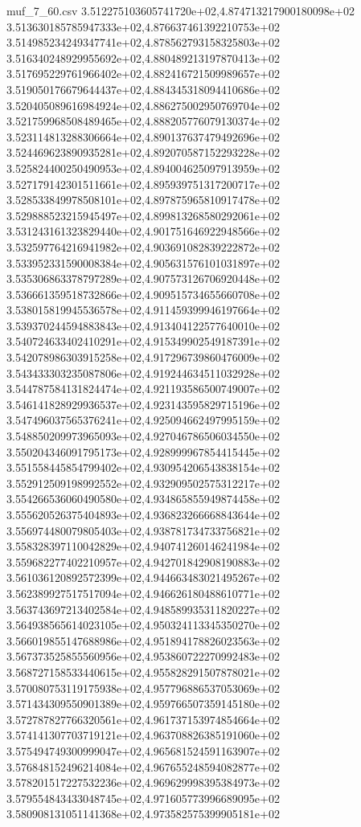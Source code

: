 \begin{filecontents*}{muf_7_60.csv}
3.512275103605741720e+02,4.874713217900180098e+02
3.513630185785947333e+02,4.876637461392210753e+02
3.514985234249347741e+02,4.878562793158325803e+02
3.516340248929955692e+02,4.880489213197870413e+02
3.517695229761966402e+02,4.882416721509989657e+02
3.519050176679644437e+02,4.884345318094410686e+02
3.520405089616984924e+02,4.886275002950769704e+02
3.521759968508489465e+02,4.888205776079130374e+02
3.523114813288306664e+02,4.890137637479492696e+02
3.524469623890935281e+02,4.892070587152293228e+02
3.525824400250490953e+02,4.894004625097913959e+02
3.527179142301511661e+02,4.895939751317200717e+02
3.528533849978508101e+02,4.897875965810917478e+02
3.529888523215945497e+02,4.899813268580292061e+02
3.531243161323829440e+02,4.901751646922948566e+02
3.532597764216941982e+02,4.903691082839222872e+02
3.533952331590008384e+02,4.905631576101031897e+02
3.535306863378797289e+02,4.907573126706920448e+02
3.536661359518732866e+02,4.909515734655660708e+02
3.538015819945536578e+02,4.911459399946197664e+02
3.539370244594883843e+02,4.913404122577640010e+02
3.540724633402410291e+02,4.915349902549187391e+02
3.542078986303915258e+02,4.917296739860476009e+02
3.543433303235087806e+02,4.919244634511032928e+02
3.544787584131824474e+02,4.921193586500749007e+02
3.546141828929936537e+02,4.923143595829715196e+02
3.547496037565376241e+02,4.925094662497995159e+02
3.548850209973965093e+02,4.927046786506034550e+02
3.550204346091795173e+02,4.928999967854415445e+02
3.551558445854799402e+02,4.930954206543838154e+02
3.552912509198992552e+02,4.932909502575312217e+02
3.554266536060490580e+02,4.934865855949874458e+02
3.555620526375404893e+02,4.936823266668843644e+02
3.556974480079805403e+02,4.938781734733756821e+02
3.558328397110042829e+02,4.940741260146241984e+02
3.559682277402210957e+02,4.942701842908190883e+02
3.561036120892572399e+02,4.944663483021495267e+02
3.562389927517517094e+02,4.946626180488610771e+02
3.563743697213402584e+02,4.948589935311820227e+02
3.564938565614023105e+02,4.950324113345350270e+02
3.566019855147688986e+02,4.951894178826023563e+02
3.567373525855560956e+02,4.953860722270992483e+02
3.568727158533440615e+02,4.955828291507878021e+02
3.570080753119175938e+02,4.957796886537053069e+02
3.571434309550901389e+02,4.959766507359145180e+02
3.572787827766320561e+02,4.961737153974854664e+02
3.574141307703719121e+02,4.963708826385191060e+02
3.575494749300999047e+02,4.965681524591163907e+02
3.576848152496214084e+02,4.967655248594082877e+02
3.578201517227532236e+02,4.969629998395384973e+02
3.579554843433048745e+02,4.971605773996689095e+02
3.580908131051141368e+02,4.973582575399905181e+02

\end{filecontents*}

